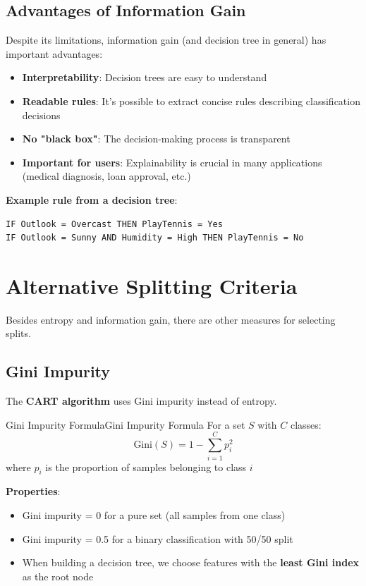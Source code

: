 \documentclass[a4paper]{article}
\theoremstyle{definition}
\begin{document}
\subsection{Advantages of Information Gain}
Despite its limitations, information gain (and decision tree in general) has important advantages:
\begin{itemize}
    \item \textbf{Interpretability}: Decision trees are easy to understand 
    \item \textbf{Readable rules}: It's possible to extract concise rules describing classification decisions
    \item \textbf{No "black box"}: The decision-making process is transparent 
    \item \textbf{Important for users}: Explainability is crucial in many applications (medical diagnosis, loan approval, etc.)
\end{itemize}
\textbf{Example rule from a decision tree}:
\begin{lstlisting}[style=ocamlpseudo]
IF Outlook = Overcast THEN PlayTennis = Yes 
IF Outlook = Sunny AND Humidity = High THEN PlayTennis = No
\end{lstlisting}
\section{Alternative Splitting Criteria}
Besides entropy and information gain, there are other measures for selecting splits.
\subsection{Gini Impurity}
The \textbf{CART algorithm} uses Gini impurity instead of entropy.
\begin{definition}{Gini Impurity Formula}{Gini Impurity Formula}
For a set \( S \) with \( C \) classes:
\[
  \text{Gini}(S) = 1 - \sum_{i = 1}^{C} p_i^2
\]
where \( p_i \) is the proportion of samples belonging to class \( i \)
\end{definition}
\textbf{Properties}:
\begin{itemize}
    \item Gini impurity = 0 for a pure set (all samples from one class)
    \item Gini impurity = 0.5 for a binary classification with 50/50 split 
    \item When building a decision tree, we choose features with the \textbf{least Gini index} as the root node 
\end{itemize}
\end{document}
